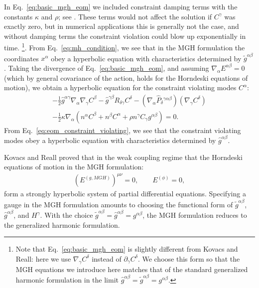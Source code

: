 \documentclass{ws-ijmpd}
\begin{document}
In Eq.~\eqref{eq:basic_mgh_eom}
we included constraint damping terms with the constants 
$\kappa$ and $\rho$; see . 
These terms would not affect the solution if $C^{\gamma}$ was
exactly zero,
but in numerical applications this is generally not the case, 
and without damping terms
the constraint violation could blow up exponentially in 
time\cite{Pretorius:2004jg,Pretorius:2005gq,Pretorius:2006tp,East:2020hgw}.
\footnote{Note that Eq.~\eqref{eq:basic_mgh_eom} is slightly different
from Kovacs and Reall\cite{Kovacs:2020ywu}: here we use 
$\nabla_{\gamma}C^{\delta}$ instead of
$\partial_{\gamma}C^{\delta}$.
We choose this form so that the MGH equations we introduce
here matches that of
the standard generalized harmonic formulation\cite{East:2020hgw}
in the limit 
$\hat{g}^{\alpha\beta}=\tilde{g}^{\alpha\beta}=g^{\alpha\beta}$.
}.
From Eq.~\eqref{eq:mh_condition},
we see that in the MGH formulation the coordinates
$x^{\alpha}$ obey a hyperbolic equation with characteristics determined by
$\tilde{g}^{\alpha\beta}$. Taking the divergence of 
Eq.~\eqref{eq:basic_mgh_eom},
and assuming 
$\nabla_{\alpha}E^{\alpha\beta}=0$ (which by general covariance 
of the action, holds for the Horndeski equations of motion),
we obtain a hyperbolic equation
for the constraint violating modes $C^{\alpha}$: 
\begin{align}
\label{eq:eom_constraint_violating}
   -  
   \frac{1}{2}\hat{g}^{\alpha\gamma}
   \nabla_{\alpha}\nabla_{\gamma}C^{\beta}
   -  
   \hat{g}^{\gamma\beta}R_{\delta\gamma}C^{\delta}
   -  
   \left(
      \nabla_{\alpha}\hat{P}_{\delta}{}^{\gamma\alpha\beta}
   \right)
   \left(
      \nabla_{\gamma}C^{\delta}
   \right)
   \nonumber \\
   -  
   \frac{1}{2}\kappa\nabla_{\alpha}\left(
      n^{\alpha}C^{\beta}
      +  
      n^{\beta}C^{\alpha}
      +  
      \rho n^{\gamma}C_{\gamma} g^{\alpha\beta}
   \right)
   =
   0
   .
\end{align}
From Eq.~\eqref{eq:eom_constraint_violating},
we see that the constraint violating modes 
obey a hyperbolic equation with characteristics determined
by $\hat{g}^{\alpha\beta}$.

Kovacs and Reall proved that in the weak coupling regime that the
Horndeski equations of motion in the MGH formulation:
\begin{align}
   \left(E^{(g,MGH)}\right)^{\mu\nu}
   = 0
   ,\qquad
   E^{(\phi)}
   =
   0
   ,
\end{align}
form a strongly hyperbolic system of 
partial differential equations\cite{Kovacs:2020pns,Kovacs:2020ywu}.
Specifying a gauge in the MGH formulation amounts to choosing the
functional form of  
$\tilde{g}^{\alpha\beta}$, 
$\hat{g}^{\alpha\beta}$, and $H^{\gamma}$.
With the choice
$\tilde{g}^{\alpha\beta}
=\hat{g}^{\alpha\beta}
=g^{\alpha\beta}$, the MGH 
formulation reduces to the generalized harmonic formulation.
\end{document}
